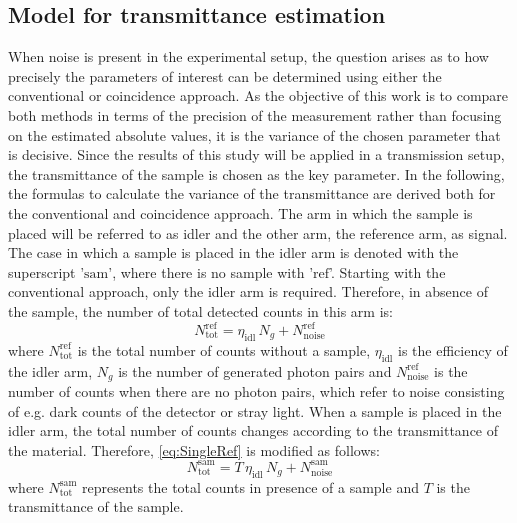 \subsection{Model for transmittance estimation}
When noise is present in the experimental setup, the question arises as to how precisely the parameters of interest can be determined using either the conventional or coincidence approach. As the objective of this work is to compare both methods in terms of the precision of the measurement rather than focusing on the estimated absolute values, it is the variance of the chosen parameter that is decisive. Since the results of this study will be applied in a transmission setup, the transmittance of the sample is chosen as the key parameter. \newline
In the following, the formulas to calculate the variance of the transmittance are derived both for the conventional and coincidence approach. The arm in which the sample is placed will be referred to as idler and the other arm, the reference arm, as signal. The case in which a sample is placed in the idler arm is denoted with the superscript '$\text{sam}$', where there is no sample with '$\text{ref}$'. \newline
Starting with the conventional approach, only the idler arm is required. Therefore, in absence of the sample, the number of total detected counts in this arm is: 
\begin{equation}
	N_{\text{tot}}^{\text{ref}} = \eta_{\text{idl}} \, N_g + N_{\text{noise}}^{\text{ref}}
	\label{eq:SingleRef}
\end{equation}
where $N_{\text{tot}}^{\text{ref}}$ is the total number of counts without a sample, $\eta_{\text{idl}}$ is the efficiency of the idler arm, $N_g$ is the number of generated photon pairs and $N_{\text{noise}}^{\text{ref}}$ is the number of counts when there are no photon pairs, which refer to noise consisting of e.g. dark counts of the detector or stray light. \newline
When a sample is placed in the idler arm, the total number of counts changes according to the transmittance of the material. Therefore, \autoref{eq:SingleRef} is modified as follows:
\begin{equation}
	N_{\text{tot}}^{\text{sam}} = T \, \eta_{\text{idl}} \, N_g + N_{\text{noise}}^{\text{sam}}
	\label{eq:SingleSam}
\end{equation}
where $N_{\text{tot}}^{\text{sam}}$ represents the total counts in presence of a sample and $T$ is the transmittance of the sample. \newline
